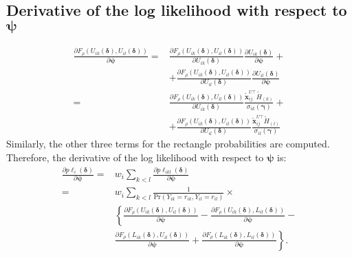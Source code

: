 \documentclass[a4paper,fleqn]{article}
\begin{document}
\subsection{Derivative of the log likelihood with respect to $\bm\psi$}
\begin{align*}
  \frac{\partial F_\rho(U_{ik}(\bm\delta),U_{il}(\bm\delta))}{\partial\bm\psi}=& \frac{\partial F_\rho(U_{ik}(\bm\delta),U_{il}(\bm\delta))}{\partial U_{ik}(\bm\delta)}\frac{\partial U_{ik}(\bm\delta)}{\partial\bm\psi} + \\
  & + \frac{\partial F_\rho(U_{ik}(\bm\delta),U_{il}(\bm\delta))}{\partial U_{il}(\bm\delta)}\frac{\partial U_{il}(\bm\delta)}{\partial\bm\psi}
\\
=& \frac{\partial F_\rho(U_{ik}(\bm\delta),U_{il}(\bm\delta))}{\partial U_{ik}(\bm\delta)} \frac{\bm {\tilde{x}}_{ij}^{U \top} \tilde H_{(k)}}{\sigma_{ik}(\bm\gamma)} + \\
  & + \frac{\partial F_\rho(U_{ik}(\bm\delta),U_{il}(\bm\delta))}{\partial U_{il}(\bm\delta)}\frac{\bm {\tilde{x}}_{ij}^{U \top} \tilde H_{(l)}}{\sigma_{il}(\bm\gamma)}
\end{align*}
Similarly, the other three terms for the rectangle probabilities are computed. Therefore, the derivative of the log likelihood with respect to $\bm\psi$ is:
\begin{align*}
\frac{\partial p\ell_i(\bm\delta)}{\partial \bm\psi}=&  w_i\sum_{k<l}\frac{\partial p\ell_{ikl}(\bm\delta)}{\partial \bm\psi}\\
=& w_i\sum_{k<l}\frac{1}{\mathrm{Pr}(Y_{ik}=r_{ik}, Y_{il}=r_{il})}\times\\
&\left\{\frac{\partial F_\rho(U_{ik}(\bm\delta),U_{il}(\bm\delta))}{\partial\bm\psi}-
\frac{\partial F_\rho(U_{ik}(\bm\delta),L_{il}(\bm\delta))}{\partial\bm\psi} - \right.\\
&\left.\frac{\partial F_\rho(L_{ik}(\bm\delta),U_{il}(\bm\delta))}{\partial\bm\psi} + \frac{\partial F_\rho(L_{ik}(\bm\delta),L_{il}(\bm\delta))}{\partial\bm\psi}\right\}.
\end{align*}
\end{document}
